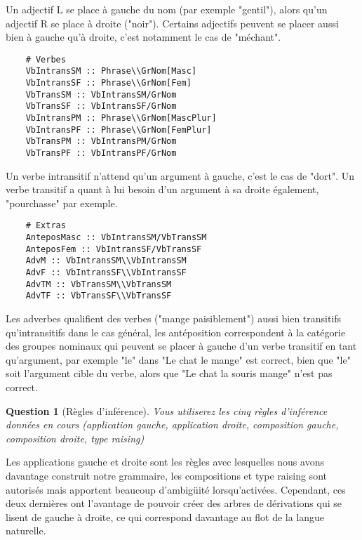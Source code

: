 \documentclass[12pt]{article}
\theoremstyle{exostyle}
\newtheorem{exo}{Question}[section]
\begin{document}
Un adjectif L se place à gauche du nom (par exemple "gentil"), alors qu'un adjectif R se place à droite ("noir"). Certains adjectifs peuvent se placer aussi bien à gauche qu'à droite, c'est notamment le cas de "méchant".

\begin{verbatim}
    # Verbes
    VbIntransSM :: Phrase\\GrNom[Masc]
    VbIntransSF :: Phrase\\GrNom[Fem]
    VbTransSM :: VbIntransSM/GrNom
    VbTransSF :: VbIntransSF/GrNom
    VbIntransPM :: Phrase\\GrNom[MascPlur]
    VbIntransPF :: Phrase\\GrNom[FemPlur]
    VbTransPM :: VbIntransPM/GrNom
    VbTransPF :: VbIntransPF/GrNom
\end{verbatim}
Un verbe intransitif n'attend qu'un argument à gauche, c'est le cas de "dort". Un verbe transitif a quant à lui besoin d'un argument à sa droite également, "pourchasse" par exemple.

\begin{verbatim}
    # Extras
    AnteposMasc :: VbIntransSM/VbTransSM
    AnteposFem :: VbIntransSF/VbTransSF
    AdvM :: VbIntransSM\\VbIntransSM
    AdvF :: VbIntransSF\\VbIntransSF
    AdvTM :: VbTransSM\\VbTransSM
    AdvTF :: VbTransSF\\VbTransSF
\end{verbatim}
Les adverbes qualifient des verbes ("mange paisiblement") aussi bien transitifs qu'intransitifs dans le cas général, les antéposition correspondent à la catégorie des groupes nominaux qui peuvent se placer à gauche d'un verbe transitif en tant qu'argument, par exemple "le" dans "Le chat le mange" est correct, bien que "le" soit l'argument cible du verbe, alors que "Le chat la souris mange" n'est pas correct.

\begin{exo}[Règles d'inférence]
\textit{Vous utiliserez les cinq règles d’inférence données en cours (application gauche,
application droite, composition gauche, composition droite, type raising)}
\end{exo}

Les applications gauche et droite sont les règles avec lesquelles nous avons davantage construit notre grammaire, les compositions et type raising sont autorisés mais apportent beaucoup d'ambigüité lorsqu'activées. Cependant, ces deux dernières ont l'avantage de pouvoir créer des arbres de dérivations qui se lisent de gauche à droite, ce qui correspond davantage au flot de la langue naturelle.
\end{document}
